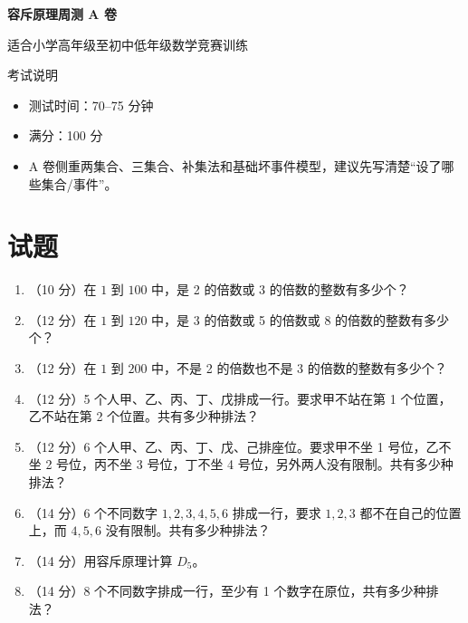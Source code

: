 \documentclass[11pt,a4paper,fontset=fandol]{ctexart}
\newcommand{\answerspace}{\vspace{2.3cm}}
\newcommand{\biganswerspace}{\vspace{3.1cm}}
\begin{document}
\thispagestyle{empty}
\begin{center}
{\fontsize{22}{28}\selectfont\bfseries 容斥原理周测 A 卷\par}
\vspace{0.4cm}
{\large 适合小学高年级至初中低年级数学竞赛训练\par}
\end{center}

\begin{infobox}{考试说明}
\begin{itemize}
  \item 测试时间：70--75 分钟
  \item 满分：100 分
  \item A 卷侧重两集合、三集合、补集法和基础坏事件模型，建议先写清楚“设了哪些集合/事件”。
\end{itemize}
\end{infobox}

\section{试题}

\begin{enumerate}
  \item （10 分）在 $1$ 到 $100$ 中，是 2 的倍数或 3 的倍数的整数有多少个？
  \answerspace

  \item （12 分）在 $1$ 到 $120$ 中，是 3 的倍数或 5 的倍数或 8 的倍数的整数有多少个？
  \answerspace

  \item （12 分）在 $1$ 到 $200$ 中，不是 2 的倍数也不是 3 的倍数的整数有多少个？
  \answerspace

  \item （12 分）5 个人甲、乙、丙、丁、戊排成一行。要求甲不站在第 1 个位置，乙不站在第 2 个位置。共有多少种排法？
  \answerspace

  \item （12 分）6 个人甲、乙、丙、丁、戊、己排座位。要求甲不坐 1 号位，乙不坐 2 号位，丙不坐 3 号位，丁不坐 4 号位，另外两人没有限制。共有多少种排法？
  \biganswerspace

  \item （14 分）6 个不同数字 $1,2,3,4,5,6$ 排成一行，要求 $1,2,3$ 都不在自己的位置上，而 $4,5,6$ 没有限制。共有多少种排法？
  \biganswerspace

  \item （14 分）用容斥原理计算 $D_5$。
  \answerspace

  \item （14 分）8 个不同数字排成一行，至少有 1 个数字在原位，共有多少种排法？
  \biganswerspace
\end{enumerate}
\end{document}
